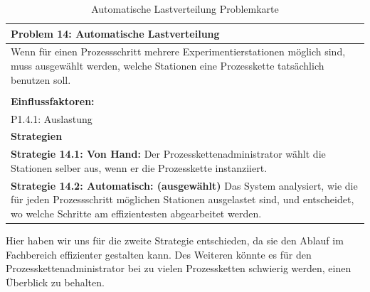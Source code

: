 \documentclass[enabledeprecatedfontcommands,fontsize=12pt,paper=a4,twoside]{scrartcl}
\begin{document}
\begin{table}[H]
    \centering
    \begin{tabular}{|p{15cm}|}
    \hline
          \textbf{Problem 14:} Automatische Lastverteilung
          \\ \hline
         Wenn für einen Prozessschritt mehrere Experimentierstationen möglich sind, muss ausgewählt werden, welche Stationen eine Prozesskette tatsächlich benutzen soll. \\
        \\  \hline
        \textbf{Einflussfaktoren: } \\
	P1.4.1: Auslastung \\
        \hline
        \textbf{Strategien} \\
         \textbf{Strategie 14.1: Von Hand:} Der Prozesskettenadministrator wählt die Stationen selber aus, wenn er die Prozesskette instanziiert. \\
	\textbf{Strategie 14.2: Automatisch: (ausgewählt)} Das System analysiert, wie die für jeden Prozessschritt möglichen Stationen ausgelastet sind, und entscheidet, wo welche Schritte am effizientesten abgearbeitet werden. \\ \hline
    \end{tabular}
    \caption{Automatische Lastverteilung Problemkarte}
    \label{tab:ProblemKarte14}
\end{table}
Hier haben wir uns für die zweite Strategie entschieden, da sie den Ablauf im Fachbereich effizienter gestalten kann. Des Weiteren könnte es für den Prozesskettenadministrator bei zu vielen Prozessketten schwierig werden, einen Überblick zu behalten. \\
\end{document}
